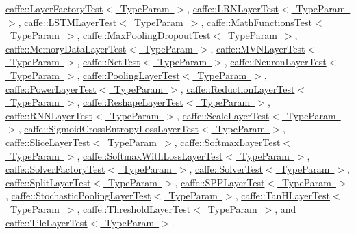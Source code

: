 \mbox{\hyperlink{classcaffe_1_1_layer_factory_test}{caffe\+::\+Layer\+Factory\+Test$<$ Type\+Param $>$}}, \mbox{\hyperlink{classcaffe_1_1_l_r_n_layer_test}{caffe\+::\+L\+R\+N\+Layer\+Test$<$ Type\+Param $>$}}, \mbox{\hyperlink{classcaffe_1_1_l_s_t_m_layer_test}{caffe\+::\+L\+S\+T\+M\+Layer\+Test$<$ Type\+Param $>$}}, \mbox{\hyperlink{classcaffe_1_1_math_functions_test}{caffe\+::\+Math\+Functions\+Test$<$ Type\+Param $>$}}, \mbox{\hyperlink{classcaffe_1_1_max_pooling_dropout_test}{caffe\+::\+Max\+Pooling\+Dropout\+Test$<$ Type\+Param $>$}}, \mbox{\hyperlink{classcaffe_1_1_memory_data_layer_test}{caffe\+::\+Memory\+Data\+Layer\+Test$<$ Type\+Param $>$}}, \mbox{\hyperlink{classcaffe_1_1_m_v_n_layer_test}{caffe\+::\+M\+V\+N\+Layer\+Test$<$ Type\+Param $>$}}, \mbox{\hyperlink{classcaffe_1_1_net_test}{caffe\+::\+Net\+Test$<$ Type\+Param $>$}}, \mbox{\hyperlink{classcaffe_1_1_neuron_layer_test}{caffe\+::\+Neuron\+Layer\+Test$<$ Type\+Param $>$}}, \mbox{\hyperlink{classcaffe_1_1_pooling_layer_test}{caffe\+::\+Pooling\+Layer\+Test$<$ Type\+Param $>$}}, \mbox{\hyperlink{classcaffe_1_1_power_layer_test}{caffe\+::\+Power\+Layer\+Test$<$ Type\+Param $>$}}, \mbox{\hyperlink{classcaffe_1_1_reduction_layer_test}{caffe\+::\+Reduction\+Layer\+Test$<$ Type\+Param $>$}}, \mbox{\hyperlink{classcaffe_1_1_reshape_layer_test}{caffe\+::\+Reshape\+Layer\+Test$<$ Type\+Param $>$}}, \mbox{\hyperlink{classcaffe_1_1_r_n_n_layer_test}{caffe\+::\+R\+N\+N\+Layer\+Test$<$ Type\+Param $>$}}, \mbox{\hyperlink{classcaffe_1_1_scale_layer_test}{caffe\+::\+Scale\+Layer\+Test$<$ Type\+Param $>$}}, \mbox{\hyperlink{classcaffe_1_1_sigmoid_cross_entropy_loss_layer_test}{caffe\+::\+Sigmoid\+Cross\+Entropy\+Loss\+Layer\+Test$<$ Type\+Param $>$}}, \mbox{\hyperlink{classcaffe_1_1_slice_layer_test}{caffe\+::\+Slice\+Layer\+Test$<$ Type\+Param $>$}}, \mbox{\hyperlink{classcaffe_1_1_softmax_layer_test}{caffe\+::\+Softmax\+Layer\+Test$<$ Type\+Param $>$}}, \mbox{\hyperlink{classcaffe_1_1_softmax_with_loss_layer_test}{caffe\+::\+Softmax\+With\+Loss\+Layer\+Test$<$ Type\+Param $>$}}, \mbox{\hyperlink{classcaffe_1_1_solver_factory_test}{caffe\+::\+Solver\+Factory\+Test$<$ Type\+Param $>$}}, \mbox{\hyperlink{classcaffe_1_1_solver_test}{caffe\+::\+Solver\+Test$<$ Type\+Param $>$}}, \mbox{\hyperlink{classcaffe_1_1_split_layer_test}{caffe\+::\+Split\+Layer\+Test$<$ Type\+Param $>$}}, \mbox{\hyperlink{classcaffe_1_1_s_p_p_layer_test}{caffe\+::\+S\+P\+P\+Layer\+Test$<$ Type\+Param $>$}}, \mbox{\hyperlink{classcaffe_1_1_stochastic_pooling_layer_test}{caffe\+::\+Stochastic\+Pooling\+Layer\+Test$<$ Type\+Param $>$}}, \mbox{\hyperlink{classcaffe_1_1_tan_h_layer_test}{caffe\+::\+Tan\+H\+Layer\+Test$<$ Type\+Param $>$}}, \mbox{\hyperlink{classcaffe_1_1_threshold_layer_test}{caffe\+::\+Threshold\+Layer\+Test$<$ Type\+Param $>$}}, and \mbox{\hyperlink{classcaffe_1_1_tile_layer_test}{caffe\+::\+Tile\+Layer\+Test$<$ Type\+Param $>$}}.

